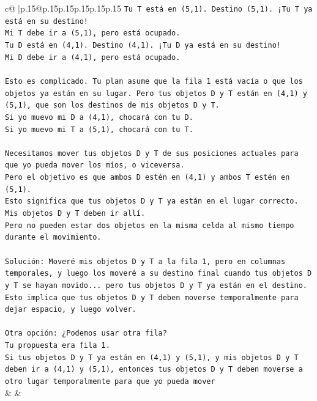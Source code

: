 \documentclass{article}
\begin{document}
{\begin{supertabular}{c@{$\;$}|p{.15\linewidth}@{}p{.15\linewidth}p{.15\linewidth}p{.15\linewidth}p{.15\linewidth}p{.15\linewidth}}
{{{\texttt{Tu T está en (5,1). Destino (5,1). ¡Tu T ya está en su destino!} \\
\texttt{Mi T debe ir a (5,1), pero está ocupado.} \\
\texttt{Tu D está en (4,1). Destino (4,1). ¡Tu D ya está en su destino!} \\
\texttt{Mi D debe ir a (4,1), pero está ocupado.} \\
\\ 
\texttt{Esto es complicado. Tu plan asume que la fila 1 está vacía o que los objetos ya están en su lugar. Pero tus objetos D y T están en (4,1) y (5,1), que son los destinos de mis objetos D y T.} \\
\texttt{Si yo muevo mi D a (4,1), chocará con tu D.} \\
\texttt{Si yo muevo mi T a (5,1), chocará con tu T.} \\
\\ 
\texttt{Necesitamos mover tus objetos D y T de sus posiciones actuales para que yo pueda mover los míos, o viceversa.} \\
\texttt{Pero el objetivo es que ambos D estén en (4,1) y ambos T estén en (5,1).} \\
\texttt{Esto significa que tus objetos D y T ya están en el lugar correcto. Mis objetos D y T deben ir allí.} \\
\texttt{Pero no pueden estar dos objetos en la misma celda al mismo tiempo durante el movimiento.} \\
\\ 
\texttt{Solución: Moveré mis objetos D y T a la fila 1, pero en columnas temporales, y luego los moveré a su destino final cuando tus objetos D y T se hayan movido... pero tus objetos D y T ya están en el destino.} \\
\texttt{Esto implica que tus objetos D y T deben moverse temporalmente para dejar espacio, y luego volver.} \\
\\ 
\texttt{Otra opción: ¿Podemos usar otra fila?} \\
\texttt{Tu propuesta era fila 1.} \\
\texttt{Si tus objetos D y T ya están en (4,1) y (5,1), y mis objetos D y T deben ir a (4,1) y (5,1), entonces tus objetos D y T deben moverse a otro lugar temporalmente para que yo pueda mover} \\
            }
        }
    }
    & & \\ \\


\end{supertabular}}
\end{document}
